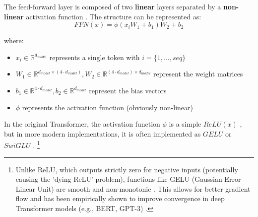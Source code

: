 The feed-forward layer is composed of two \textbf{linear} layers separated by a \textbf{non-linear} activation function \cite{arxiv-attention}. The structure can be represented as:
\begin{equation}
FFN(x)=\phi(x_iW_1 + b_1)W_2+b_2
\end{equation}

where:
\begin{itemize}
\item $x_i \in \mathbb{R}^{d_{model}}$ represents a single token with $i=\{1,\dots, seq\}$
\item $W_1 \in \mathbb{R}^{d_{model}\times(4\cdot d_{model})}, W_2 \in \mathbb{R}^{(4 \cdot d_{model})\times d_{model}}$ represent the weight matrices
\item $b_1 \in \mathbb{R}^{4\cdot d_{model}}, b_2\in \mathbb{R}^{d_{model}}$ represent the bias vectors
\item $\phi$ represents the activation function (obviously non-linear)
\end{itemize}

In the original Transformer, the activation function $\phi$ is a simple $ReLU(x)$ \cite{arxiv-attention}, but in more modern implementations, it is often implemented as $GELU$ or $SwiGLU$ \cite{stanford, attention-is-not}. \footnote{Unlike ReLU, which outputs strictly zero for negative inputs (potentially causing the 'dying ReLU' problem), functions like GELU (Gaussian Error Linear Unit) are smooth and non-monotonic \cite{stanford}. This allows for better gradient flow and has been empirically shown to improve convergence in deep Transformer models (e.g., BERT, GPT-3) \cite{stanford, attention-is-not}.}



